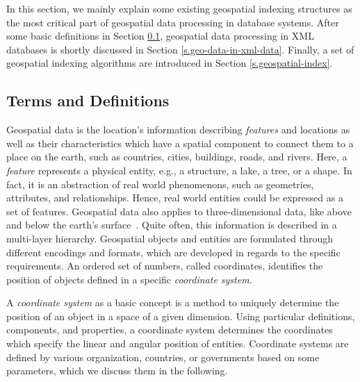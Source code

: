 \documentclass[a4paper,12pt]{article}
\begin{document}
In this section, we mainly explain some existing geospatial indexing structures as the most critical part of geospatial data processing in database systems. After some basic definitions in Section \ref{termsanddef}, geospatial data processing in XML~\cite{www/xml} databases is shortly discussed in Section \ref{s.geo-data-in-xml-data}.
Finally, a set of geospatial indexing algorithms are introduced in Section \ref{s.geospatial-index}.

\subsection{Terms and Definitions}
\label{termsanddef}
Geospatial data is the location's information describing \textit{features} and locations as well as their characteristics which have a spatial component to connect them to a place on the earth, such as countries, cities, buildings, roads, and rivers. Here, a \textit{feature} represents a physical entity, e.g., a structure, a lake, a tree, or a shape. In fact, it is an abstraction of real world phenomenons, such as geometries, attributes, and relationships. Hence, real world entities could be expressed as a set of features.
Geospatial data also applies to three-dimensional data, like above and below the earth's surface~\cite{powell}. Quite often, this information is described in a multi-layer hierarchy. Geospatial objects and entities are formulated through different encodings and formats, which are developed in regards to the specific requirements. An ordered set of numbers, called coordinates, identifies the position of objects  defined in a specific \textit{coordinate system}. 

A \emph{coordinate system} as a basic concept is a method to uniquely determine the position of an object in a space of a given dimension. Using particular definitions, components, and properties, a coordinate system determines the coordinates which specify the linear and angular position of entities. Coordinate systems are defined by various organization, countries, or governments based on some parameters, which we discuss them in the following.
\end{document}
